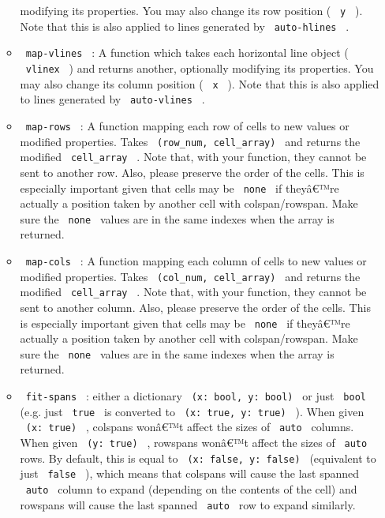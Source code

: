 \begin{enumerate}
\begin{itemize}
    modifying its properties. You may also change its row position (
    \texttt{\ y\ } ). Note that this is also applied to lines generated
    by \texttt{\ auto-hlines\ } .
  \item
    \texttt{\ map-vlines\ } : A function which takes each horizontal
    line object ( \texttt{\ vlinex\ } ) and returns another, optionally
    modifying its properties. You may also change its column position (
    \texttt{\ x\ } ). Note that this is also applied to lines generated
    by \texttt{\ auto-vlines\ } .
  \item
    \texttt{\ map-rows\ } : A function mapping each row of cells to new
    values or modified properties. Takes
    \texttt{\ (row\_num,\ cell\_array)\ } and returns the modified
    \texttt{\ cell\_array\ } . Note that, with your function, they
    cannot be sent to another row. Also, please preserve the order of
    the cells. This is especially important given that cells may be
    \texttt{\ none\ } if theyâ€™re actually a position taken by another
    cell with colspan/rowspan. Make sure the \texttt{\ none\ } values
    are in the same indexes when the array is returned.
  \item
    \texttt{\ map-cols\ } : A function mapping each column of cells to
    new values or modified properties. Takes
    \texttt{\ (col\_num,\ cell\_array)\ } and returns the modified
    \texttt{\ cell\_array\ } . Note that, with your function, they
    cannot be sent to another column. Also, please preserve the order of
    the cells. This is especially important given that cells may be
    \texttt{\ none\ } if theyâ€™re actually a position taken by another
    cell with colspan/rowspan. Make sure the \texttt{\ none\ } values
    are in the same indexes when the array is returned.
  \item
    \texttt{\ fit-spans\ } : either a dictionary
    \texttt{\ (x:\ bool,\ y:\ bool)\ } or just \texttt{\ bool\ } (e.g.
    just \texttt{\ true\ } is converted to
    \texttt{\ (x:\ true,\ y:\ true)\ } ). When given
    \texttt{\ (x:\ true)\ } , colspans wonâ€™t affect the sizes of
    \texttt{\ auto\ } columns. When given \texttt{\ (y:\ true)\ } ,
    rowspans wonâ€™t affect the sizes of \texttt{\ auto\ } rows. By
    default, this is equal to \texttt{\ (x:\ false,\ y:\ false)\ }
    (equivalent to just \texttt{\ false\ } ), which means that colspans
    will cause the last spanned \texttt{\ auto\ } column to expand
    (depending on the contents of the cell) and rowspans will cause the
    last spanned \texttt{\ auto\ } row to expand similarly.


\end{itemize}
\end{enumerate}
